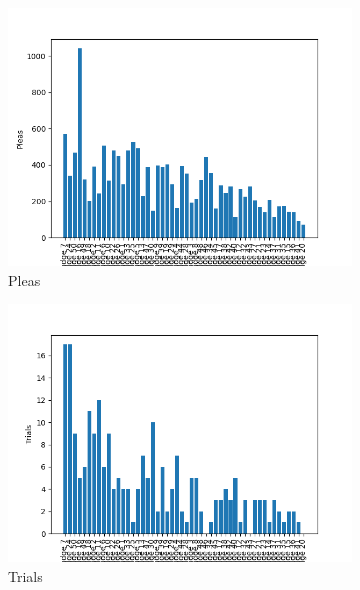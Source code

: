 \documentclass[11pt]{article}
\begin{document}
    \begin{figure}[H]
      \centering
        \begin{subfigure}[b]{0.45\textwidth}
          \includegraphics[width=\textwidth]{../../../output/figures/Exploration/judge_pleas.png}
          \caption{Pleas}
        \end{subfigure}
        \hfill
        \begin{subfigure}[b]{0.45\textwidth}
          \includegraphics[width=\textwidth]{../../../output/figures/Exploration/judge_trials.png}
          \caption{Trials}

        \end{subfigure}
        \begin{subfigure}[b]{0.45\textwidth}


\end{subfigure}
\end{figure}
\end{document}
